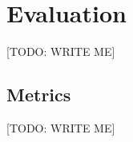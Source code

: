 \documentclass{article} %
\begin{document}


\section{Evaluation}
\label{sec:evaluation}

[TODO: WRITE ME]


\subsection{Metrics}
\label{sec:metrics}

[TODO: WRITE ME]

\end{document}
